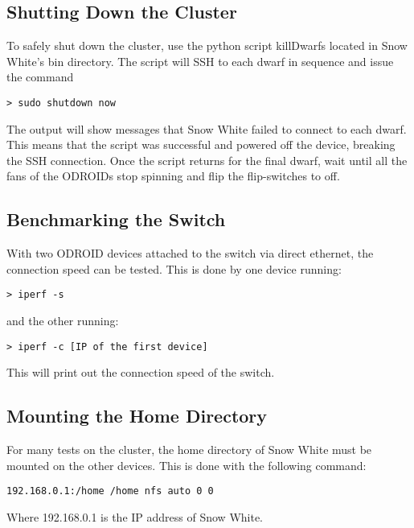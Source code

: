 \subsection{Shutting Down the Cluster}
To safely shut down the cluster, use the python script killDwarfs located in Snow White's bin directory. The script will SSH to each dwarf in sequence and issue the command
\begin{lstlisting}
> sudo shutdown now
\end{lstlisting}

The output will show messages that Snow White failed to connect to each dwarf. This means that the script was successful and powered off the device, breaking the SSH connection. Once the script returns for the final dwarf, wait until all the fans of the ODROIDs stop spinning and flip the flip-switches to off.

\subsection{Benchmarking the Switch}
With two ODROID devices attached to the switch via direct ethernet, the connection speed can be tested. This is done by one device running:
\begin{lstlisting}
> iperf -s
\end{lstlisting}
and the other running:
\begin{lstlisting}
> iperf -c [IP of the first device]
\end{lstlisting}
This will print out the connection speed of the switch.

\subsection{Mounting the Home Directory}
For many tests on the cluster, the home directory of Snow White must be mounted on the other devices. This is done with the following command:
\begin{lstlisting}
192.168.0.1:/home /home nfs auto 0 0
\end{lstlisting}
Where 192.168.0.1 is the IP address of Snow White.

